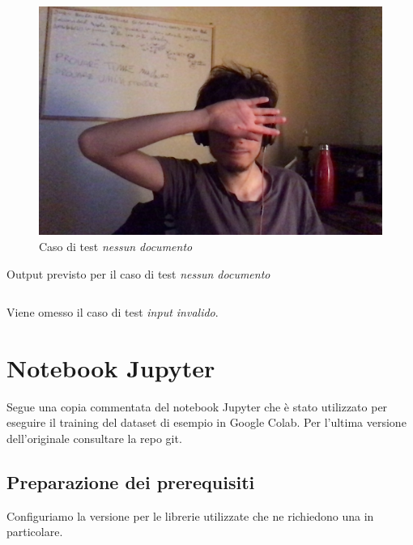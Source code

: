 \documentclass[12pt,a4paper]{article}
\begin{document}
\begin{figure}[H]
    \caption{Caso di test \textit{nessun documento}}
    \centering
    \includegraphics[width=\textwidth,height=\textheight,keepaspectratio]{test_background.jpg}
\end{figure}

\begin{listing}[H]
    \caption{Output previsto per il caso di test \textit{nessun documento}}
    \inputminted{python}{test_background.py}
\end{listing}

Viene omesso il caso di test \textit{input invalido}.

\pagebreak

\section{Notebook Jupyter}
\label{s:notebook}


Segue una copia commentata del notebook Jupyter che è stato utilizzato
per eseguire il training del dataset di esempio in Google Colab. Per
l'ultima versione dell'originale consultare la repo git.

\subsection{Preparazione dei prerequisiti}

Configuriamo la versione per le librerie utilizzate che ne richiedono
una in particolare.
\end{document}
